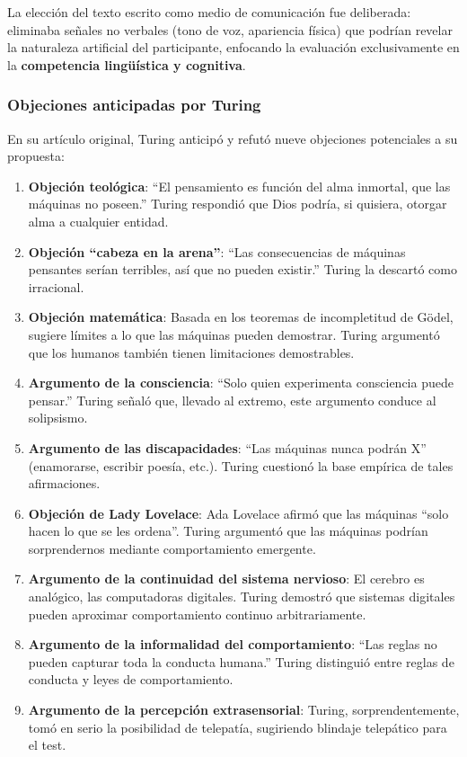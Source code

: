 \documentclass[12pt,a4paper]{report}
\numberwithin{figure}{section}
\begin{document}
La elección del texto escrito como medio de comunicación fue deliberada: eliminaba señales no verbales (tono de voz, apariencia física) que podrían revelar la naturaleza artificial del participante, enfocando la evaluación exclusivamente en la \textbf{competencia lingüística y cognitiva}.

\subsubsection{Objeciones anticipadas por Turing}
\label{subsubsec:objeciones_turing}

En su artículo original, Turing anticipó y refutó nueve objeciones potenciales a su propuesta:

\begin{enumerate}
    \item \textbf{Objeción teológica}: ``El pensamiento es función del alma inmortal, que las máquinas no poseen.'' Turing respondió que Dios podría, si quisiera, otorgar alma a cualquier entidad.
    
    \item \textbf{Objeción ``cabeza en la arena''}: ``Las consecuencias de máquinas pensantes serían terribles, así que no pueden existir.'' Turing la descartó como irracional.
    
    \item \textbf{Objeción matemática}: Basada en los teoremas de incompletitud de Gödel, sugiere límites a lo que las máquinas pueden demostrar. Turing argumentó que los humanos también tienen limitaciones demostrables.
    
    \item \textbf{Argumento de la consciencia}: ``Solo quien experimenta consciencia puede pensar.'' Turing señaló que, llevado al extremo, este argumento conduce al solipsismo.
    
    \item \textbf{Argumento de las discapacidades}: ``Las máquinas nunca podrán X'' (enamorarse, escribir poesía, etc.). Turing cuestionó la base empírica de tales afirmaciones.
    
    \item \textbf{Objeción de Lady Lovelace}: Ada Lovelace afirmó que las máquinas ``solo hacen lo que se les ordena''. Turing argumentó que las máquinas podrían sorprendernos mediante comportamiento emergente.
    
    \item \textbf{Argumento de la continuidad del sistema nervioso}: El cerebro es analógico, las computadoras digitales. Turing demostró que sistemas digitales pueden aproximar comportamiento continuo arbitrariamente.
    
    \item \textbf{Argumento de la informalidad del comportamiento}: ``Las reglas no pueden capturar toda la conducta humana.'' Turing distinguió entre reglas de conducta y leyes de comportamiento.
    
    \item \textbf{Argumento de la percepción extrasensorial}: Turing, sorprendentemente, tomó en serio la posibilidad de telepatía, sugiriendo blindaje telepático para el test.
\end{enumerate}
\end{document}
